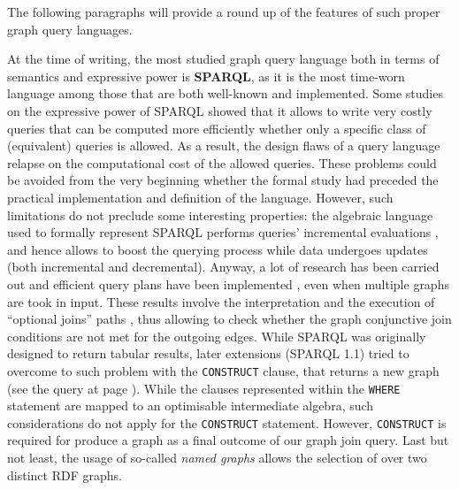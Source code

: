 The following paragraphs will provide a round up of the features of such proper graph query languages.




At the time of writing, the most studied graph query language  both in terms of
semantics and expressive power is \textbf{SPARQL}, as it is the most time-worn language among those that are both well-known
and implemented. Some studies on the expressive power of SPARQL \cite{SparQLExpr,Perez2009} showed that
it allows to write very costly queries that can be computed more
efficiently whether only a specific class of (equivalent) queries is allowed. As a result, the design flaws
of a query language relapse on the computational cost of the allowed queries. These problems could be avoided
from the very beginning whether the formal study had preceded the practical implementation and definition of the language.
However, such limitations do not preclude some interesting properties: the algebraic language used to
formally represent SPARQL performs queries' incremental evaluations \cite{SparqlIncr}, and hence
allows to boost the querying process while data undergoes updates (both incremental and decremental).
Anyway, a lot of research has been carried out \cite{Perez2009} and efficient query plans have been implemented \cite{sparqlScalable}, even when multiple
graphs are took in input.
These results involve the interpretation and the  execution of ``optional  joins''  paths \cite{SIGMOD2015Atre},
thus allowing to check whether the graph conjunctive join conditions are not met for the outgoing edges.
While SPARQL was originally designed to return tabular results,
later extensions (SPARQL 1.1) tried to overcome to such problem with the \texttt{CONSTRUCT} clause,
that returns a new graph (see the query at page \pageref{sqlrefch3}).
While the clauses represented within the \texttt{WHERE} statement are mapped to an optimisable intermediate algebra, such considerations do not apply for the \texttt{CONSTRUCT} statement.
However, \texttt{CONSTRUCT} is required for produce a graph as a final outcome of our
graph join query.
Last but not least, the usage of so-called \textit{named graphs}
allows the selection of over two distinct RDF graphs.

